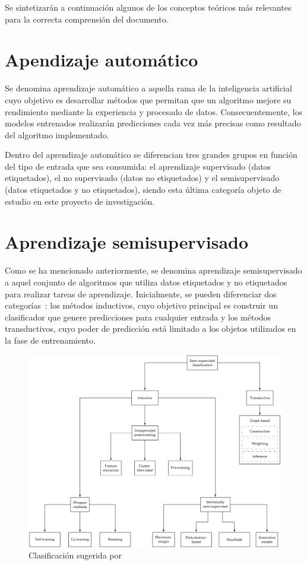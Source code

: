 
Se sintetizarán a continuación algunos de los conceptos teóricos más relevantes para la correcta comprensión del documento.

\section{Apendizaje automático}

Se denomina aprendizaje automático a aquella rama de la inteligencia artificial cuyo objetivo es desarrollar métodos que permitan que un algoritmo mejore su rendimiento mediante la experiencia y procesado de datos. Consecuentemente, los modelos entrenados realizarán predicciones cada vez más precisas como resultado del algoritmo implementado.

Dentro del aprendizaje automático se diferencian tres grandes grupos en función del tipo de entrada que sea consumida: el aprendizaje supervisado (datos etiquetados), el no supervisado (datos no etiquetados) y el semisupervisado (datos etiquetados y no etiquetados), siendo esta última categoría objeto de estudio en este proyecto de investigación. 

\section{Aprendizaje semisupervisado}

Como se ha mencionado anteriormente, se denomina aprendizaje semisupervisado a aquel conjunto de algoritmos que utiliza datos etiquetados y no etiquetados para realizar tareas de aprendizaje. Inicialmente, se pueden diferenciar dos categorías~\cite{engelen2020surveyOnSemiSupervised}: los métodos inductivos, cuyo objetivo principal es construir un clasificador que genere predicciones para cualquier entrada y los métodos transductivos, cuyo poder de predicción está limitado a los objetos utilizados en la fase de entrenamiento.


\begin{figure}[h]
\caption{Clasificación sugerida por~\cite{engelen2020surveyOnSemiSupervised}}
\centering
\includegraphics[width=\textwidth]{../img/memoria/esquemaHoos}
\end{figure}

